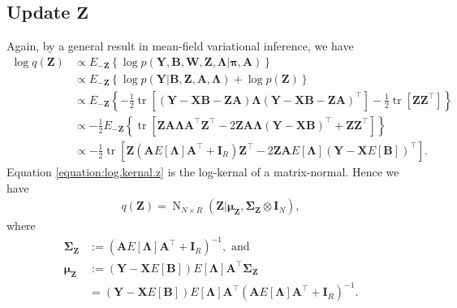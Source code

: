 \documentclass[11pt,authoryear]{article}
\DeclareMathOperator*{\tr}{tr}
\DeclareMathOperator*{\N}{N}
\newcommand{\bs}[1]{\boldsymbol{#1}}
\begin{document}
\subsection{Update $\bs{Z}$}
Again, by a general result in mean-field variational inference, we have
\begin{align}
\log q(\bs{Z})&\propto E_{-\bs{Z}}\left\{\log p(\bs{Y},\bs{B},\bs{W},\bs{Z},\bs{\Lambda}|\bs{\pi},\bs{A})\right\}\\
&\propto E_{-\bs{Z}}\left\{\log p(\bs{Y}|\bs{B}, \bs{Z}, \bs{A}, \bs{\Lambda}) + \log p(\bs{Z})\right\}\\
&\propto E_{-\bs{Z}}\left\{-\frac{1}{2}\tr\left[(\bs{Y}-\bs{X}\bs{B}-\bs{Z}\bs{A})\bs{\Lambda}(\bs{Y}-\bs{X}\bs{B} - \bs{Z}\bs{A})^{\intercal}\right] - \frac{1}{2}\tr[\bs{Z}\bs{Z}^{\intercal}]\right\}\\
&\propto -\frac{1}{2}E_{-\bs{Z}}\left\{ \tr\left[ \bs{Z}\bs{A}\bs{\Lambda}\bs{A}^{\intercal}\bs{Z}^{\intercal} - 2 \bs{Z}\bs{A}\bs{\Lambda}(\bs{Y}-\bs{X}\bs{B})^{\intercal} + \bs{Z}\bs{Z}^{\intercal}\right]\right\}\\
\label{equation:log.kernal.z}&\propto -\frac{1}{2}\tr\left[ \bs{Z}\left(\bs{A}E[\bs{\Lambda}]\bs{A}^{\intercal} + \bs{I}_R\right)\bs{Z}^{\intercal} - 2 \bs{Z}\bs{A}E[\bs{\Lambda}](\bs{Y}-\bs{X}E[\bs{B}])^{\intercal}\right].
\end{align}
Equation \eqref{equation:log.kernal.z} is the log-kernal of a matrix-normal. Hence we have
\begin{align}
q(\bs{Z}) = \N_{N \times R}(\bs{Z}|\bs{\mu}_{\bs{Z}}, \bs{\Sigma}_{\bs{Z}} \otimes \bs{I}_{N}),
\end{align}
where
\begin{align}
\bs{\Sigma}_{\bs{Z}} &:= \left(\bs{A}E[\bs{\Lambda}]\bs{A}^{\intercal} + \bs{I}_R\right)^{-1}, \text{ and}\\
\bs{\mu}_{\bs{Z}} &:= (\bs{Y}-\bs{X}E[\bs{B}])E[\bs{\Lambda}] \bs{A}^{\intercal}\bs{\Sigma}_{\bs{Z}}\\
&= (\bs{Y}-\bs{X}E[\bs{B}])E[\bs{\Lambda}] \bs{A}^{\intercal}\left(\bs{A}E[\bs{\Lambda}]\bs{A}^{\intercal} + \bs{I}_R\right)^{-1}.
\end{align}
\end{document}
